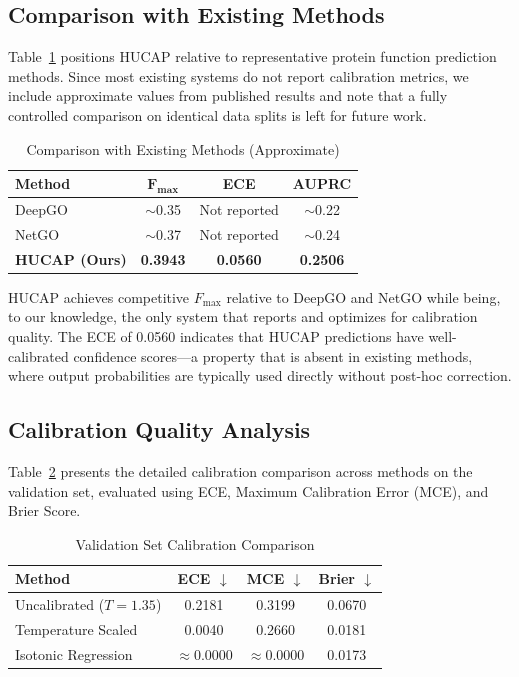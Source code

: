 \documentclass[conference]{IEEEtran}
\begin{document}
\subsection{Comparison with Existing Methods}

Table~\ref{tab:comparison} positions HUCAP relative to representative protein function prediction methods. Since most existing systems do not report calibration metrics, we include approximate values from published results and note that a fully controlled comparison on identical data splits is left for future work.

\begin{table}[t]
\centering
\caption{Comparison with Existing Methods (Approximate)}
\label{tab:comparison}
\begin{tabular}{@{}lccc@{}}
\toprule
\textbf{Method} & $\mathbf{F_{\max}}$ & \textbf{ECE} & \textbf{AUPRC} \\
\midrule
DeepGO~\cite{kulmanov2018} & $\sim$0.35 & Not reported & $\sim$0.22 \\
NetGO~\cite{you2019} & $\sim$0.37 & Not reported & $\sim$0.24 \\
\textbf{HUCAP (Ours)} & \textbf{0.3943} & \textbf{0.0560} & \textbf{0.2506} \\
\bottomrule
\end{tabular}
\end{table}

HUCAP achieves competitive $F_{\max}$ relative to DeepGO and NetGO while being, to our knowledge, the only system that reports and optimizes for calibration quality. The ECE of 0.0560 indicates that HUCAP predictions have well-calibrated confidence scores---a property that is absent in existing methods, where output probabilities are typically used directly without post-hoc correction.

\subsection{Calibration Quality Analysis}

Table~\ref{tab:calibration} presents the detailed calibration comparison across methods on the validation set, evaluated using ECE, Maximum Calibration Error (MCE), and Brier Score.

\begin{table}[t]
\centering
\caption{Validation Set Calibration Comparison}
\label{tab:calibration}
\begin{tabular}{@{}lccc@{}}
\toprule
\textbf{Method} & \textbf{ECE} $\downarrow$ & \textbf{MCE} $\downarrow$ & \textbf{Brier} $\downarrow$ \\
\midrule
Uncalibrated ($T{=}1.35$) & 0.2181 & 0.3199 & 0.0670 \\
Temperature Scaled & 0.0040 & 0.2660 & 0.0181 \\
Isotonic Regression & $\approx$0.0000 & $\approx$0.0000 & 0.0173 \\
\bottomrule
\end{tabular}
\end{table}
\end{document}
